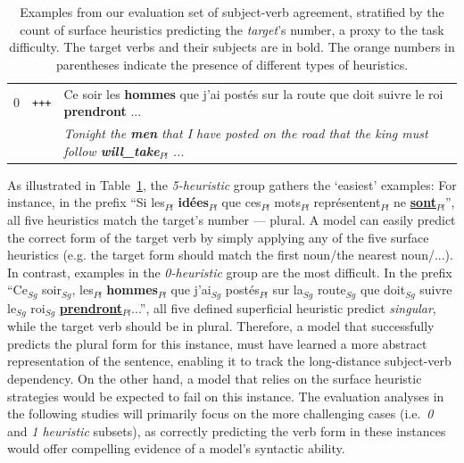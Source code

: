 \begin{table}[ht]
{\begin{tabular}{ccl}
    0 & \texttt{+++} & Ce soir les \textbf{hommes} que j'ai postés sur la route que doit suivre le roi \textbf{prendront} ...    \\
                                         && \textit{\fontsize{11}{11}\selectfont Tonight the \textbf{men} that I have posted on the road that the king must follow  \textbf{will\_take}$_{Pl}$ ... }\\
      \bottomrule
    \end{tabular}}
  \caption{Examples from our evaluation set of subject-verb agreement, stratified by the count of
    surface heuristics predicting the \emph{target}'s number, a proxy
    to the task difficulty. The target verbs and their subjects are in
    bold. The orange numbers in parentheses indicate the presence of different types of heuristics.   \label{tab:examples_h} }
\end{table}

As illustrated in Table~\ref{tab:examples_h}, the \textit{5-heuristic} group gathers the
`easiest' examples: For instance, in the prefix ``Si les$_{Pl}$ \textbf{idées$_{Pl}$} que ces$_{Pl}$ mots$_{Pl}$ représentent$_{Pl}$ ne \underline{\bf sont$_{Pl}$}'', all five heuristics match the target's number --- plural. A model can easily predict the correct form
of the target verb by simply applying any of the five surface heuristics (e.g. the target form should match the first noun/the nearest noun/...). In contrast, examples in the \textit{0-heuristic} group
are the most difficult. In the prefix ``Ce$_{Sg}$ soir$_{Sg}$, les$_{Pl}$ \textbf{hommes$_{Pl}$} que j'ai$_{Sg}$ postés$_{Pl}$ sur la$_{Sg}$ route$_{Sg}$ que doit$_{Sg}$ suivre le$_{Sg}$ roi$_{Sg}$  \underline{\bf prendront$_{Pl}$}...'', all five defined superficial heuristic predict \textit{singular}, while the target verb should be in plural. Therefore, a model that successfully predicts the plural form for this instance, must have learned a more
abstract representation of the sentence, enabling it to track the long-distance subject-verb dependency. On the other hand, a model that relies on the surface heuristic strategies would be expected to fail on this instance. The evaluation analyses in the following studies will primarily focus on the more challenging cases (i.e.\ \emph{0}
and \emph{1 heuristic} subsets), as correctly predicting the verb form in these instances would offer compelling evidence of a model's syntactic ability. 


